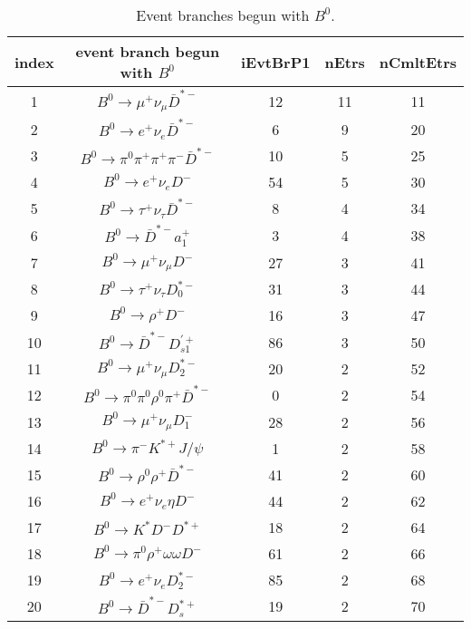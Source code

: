 \documentclass[landscape]{article}
\begin{document}
\begin{table}[htbp!]
\caption{Event branches begun with $ B^{0} $.}
\small
\centering
\begin{tabular}{|c|c|c|c|c|}
\hline
index & event branch begun with $ B^{0} $ & iEvtBrP1 & nEtrs & nCmltEtrs \\
\hline
1 & $ B^{0} \rightarrow \mu^{+} \nu_{\mu} \bar{D}^{*-} $ & 12 & 11 & 11 \\
\hline
2 & $ B^{0} \rightarrow e^{+} \nu_{e} \bar{D}^{*-} $ & 6 & 9 & 20 \\
\hline
3 & $ B^{0} \rightarrow \pi^{0} \pi^{+} \pi^{+} \pi^{-} \bar{D}^{*-} $ & 10 & 5 & 25 \\
\hline
4 & $ B^{0} \rightarrow e^{+} \nu_{e} D^{-} $ & 54 & 5 & 30 \\
\hline
5 & $ B^{0} \rightarrow \tau^{+} \nu_{\tau} \bar{D}^{*-} $ & 8 & 4 & 34 \\
\hline
6 & $ B^{0} \rightarrow \bar{D}^{*-} a_{1}^{+} $ & 3 & 4 & 38 \\
\hline
7 & $ B^{0} \rightarrow \mu^{+} \nu_{\mu} D^{-} $ & 27 & 3 & 41 \\
\hline
8 & $ B^{0} \rightarrow \tau^{+} \nu_{\tau} D_{0}^{*-} $ & 31 & 3 & 44 \\
\hline
9 & $ B^{0} \rightarrow \rho^{+} D^{-} $ & 16 & 3 & 47 \\
\hline
10 & $ B^{0} \rightarrow \bar{D}^{*-} D_{s1}^{\prime+} $ & 86 & 3 & 50 \\
\hline
11 & $ B^{0} \rightarrow \mu^{+} \nu_{\mu} D_{2}^{*-} $ & 20 & 2 & 52 \\
\hline
12 & $ B^{0} \rightarrow \pi^{0} \pi^{0} \rho^{0} \pi^{+} \bar{D}^{*-} $ & 0 & 2 & 54 \\
\hline
13 & $ B^{0} \rightarrow \mu^{+} \nu_{\mu} D_{1}^{-} $ & 28 & 2 & 56 \\
\hline
14 & $ B^{0} \rightarrow \pi^{-} K^{*+} J/\psi $ & 1 & 2 & 58 \\
\hline
15 & $ B^{0} \rightarrow \rho^{0} \rho^{+} \bar{D}^{*-} $ & 41 & 2 & 60 \\
\hline
16 & $ B^{0} \rightarrow e^{+} \nu_{e} \eta D^{-} $ & 44 & 2 & 62 \\
\hline
17 & $ B^{0} \rightarrow K^{*} D^{-} D^{*+} $ & 18 & 2 & 64 \\
\hline
18 & $ B^{0} \rightarrow \pi^{0} \rho^{+} \omega \omega D^{-} $ & 61 & 2 & 66 \\
\hline
19 & $ B^{0} \rightarrow e^{+} \nu_{e} D_{2}^{*-} $ & 85 & 2 & 68 \\
\hline
20 & $ B^{0} \rightarrow \bar{D}^{*-} D_{s}^{*+} $ & 19 & 2 & 70 \\

\end{tabular}
\end{table}
\end{document}
